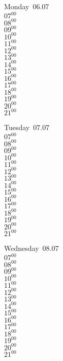\documentclass[11pt,a4paper]{book}\usepackage[]{graphicx}\usepackage[]{color}
\begin{document}
\begin{headerbox}
\end{headerbox}
\begin{weekdaybox}
  Monday~06.07\\
  { 
  \vfill
  $07^{00}$\\
$08^{00}$\\
$09^{00}$\\
$10^{00}$\\
$11^{00}$\\
$12^{00}$\\
$13^{00}$\\
$14^{00}$\\
$15^{00}$\\
$16^{00}$\\
$17^{00}$\\
$18^{00}$\\
$19^{00}$\\
$20^{00}$\\
$21^{00}$\\
  }
\end{weekdaybox}
\begin{weekdaybox}
  Tuesday~07.07\\
  { 
  \vfill
  $07^{00}$\\
$08^{00}$\\
$09^{00}$\\
$10^{00}$\\
$11^{00}$\\
$12^{00}$\\
$13^{00}$\\
$14^{00}$\\
$15^{00}$\\
$16^{00}$\\
$17^{00}$\\
$18^{00}$\\
$19^{00}$\\
$20^{00}$\\
$21^{00}$\\
  }
\end{weekdaybox}
\begin{weekdaybox}
  Wednesday~08.07\\
  { 
  \vfill
  $07^{00}$\\
$08^{00}$\\
$09^{00}$\\
$10^{00}$\\
$11^{00}$\\
$12^{00}$\\
$13^{00}$\\
$14^{00}$\\
$15^{00}$\\
$16^{00}$\\
$17^{00}$\\
$18^{00}$\\
$19^{00}$\\
$20^{00}$\\
$21^{00}$\\
  }
\end{weekdaybox}
\end{document}

